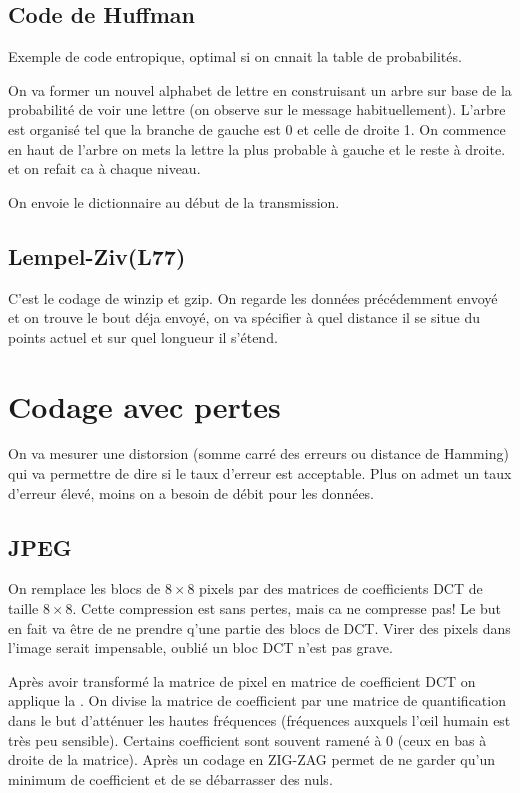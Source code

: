 \subsection{Code de Huffman}

Exemple de code entropique, optimal si on cnnait la table de probabilités.

On va former un nouvel alphabet de lettre en construisant un arbre sur base de la probabilité de voir une lettre (on observe sur le message habituellement). L'arbre est organisé tel que la branche de gauche est 0 et celle de droite 1. On commence en haut de l'arbre on mets la lettre la plus probable à gauche et le reste à droite. et on refait ca à chaque niveau.

On envoie le dictionnaire au début de la transmission.

\subsection{Lempel-Ziv(L77)}

C'est le codage de winzip et gzip. On regarde les données précédemment envoyé et on trouve le bout déja envoyé, on va spécifier à quel distance il se situe du points actuel et sur quel longueur il s'étend.

\section{Codage avec pertes}

On va mesurer une distorsion (somme carré des erreurs ou distance de Hamming) qui va permettre de dire si le taux d'erreur est acceptable. Plus on admet un taux d'erreur élevé, moins on a besoin de débit pour les données.

\newpage
\subsection{JPEG}

On remplace les blocs de $8 \times 8$ pixels par des matrices de coefficients DCT de taille $8 \times 8$. Cette compression est sans pertes, mais ca ne compresse pas! Le but en fait va être de ne prendre q'une partie des blocs de DCT. Virer des pixels dans l'image serait impensable, oublié un bloc DCT n'est pas grave.

Après avoir transformé la matrice de pixel en matrice de coefficient DCT on applique la . On divise la matrice de coefficient par une matrice de quantification dans le but d’atténuer les hautes fréquences (fréquences auxquels l’œil humain est très peu sensible). Certains coefficient sont souvent ramené à 0 (ceux en bas à droite de la matrice). Après un codage en ZIG-ZAG permet de ne garder qu'un minimum de coefficient et de se débarrasser des nuls.

